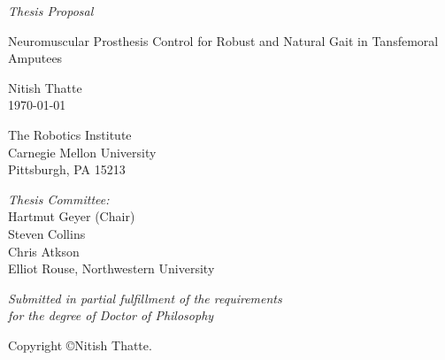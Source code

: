 \documentclass{tufte-book}
\title{\proposaltitle}
\author[Nitish Thatte]{Nitish Thatte}
\newcommand{\proposaltitle}{Neuromuscular Prosthesis Control for Robust and Natural Gait in Tansfemoral Amputees}
\begin{document}

\begin{titlepage}
	\begin{fullwidth}
	\centering
    {\Large \it Thesis Proposal} \\
    {\huge{\proposaltitle}\par}
    \vspace{0.5in}
    
    Nitish Thatte \\
    \today \\
    \vspace{1 in}
    
    The Robotics Institute \\
    Carnegie Mellon University \\
    Pittsburgh, PA 15213
    \vspace{1in}
    
   	{\it Thesis Committee:}\\
    Hartmut Geyer (Chair)\\
    Steven Collins\\
    Chris Atkson\\
    Elliot Rouse, Northwestern University\\
    \vspace{1in}
   
   	{\it Submitted in partial fulfillment of the requirements\\ for the degree of Doctor of Philosophy}\\
    \vspace{1in}
    
    Copyright \copyright \the\year Nitish Thatte.
 	\end{fullwidth}
\end{titlepage}



\tableofcontents

\listoffigures

\listoftables


\mainmatter


\backmatter




\printindex
\end{document}
